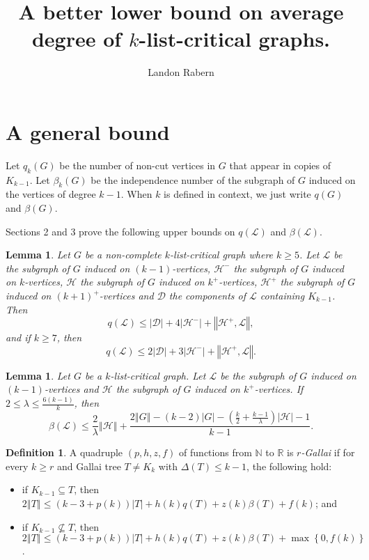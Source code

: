 \documentclass[10pt]{article}
\title{A better lower bound on average degree of $k$-list-critical graphs.}
\author{Landon Rabern}
\theoremstyle{plain}
\newtheorem{lem}[thm]{Lemma}
\theoremstyle{definition}
\newtheorem{defn}{Definition}
\theoremstyle{remark}
\newcommand{\fancy}[1]{\mathcal{#1}}
\newcommand{\IN}{\mathbb{N}}
\newcommand{\IR}{\mathbb{R}}
\newcommand{\D}{\fancy{D}}
\renewcommand{\L}{\fancy{L}}
\newcommand{\HH}{\fancy{H}}
\newcommand{\set}[1]{\left\{ #1 \right\}}
\newcommand{\card}[1]{\left|#1\right|}
\newcommand{\size}[1]{\left\Vert#1\right\Vert}
\newcommand{\parens}[1]{\left( #1 \right)}
\def\D{\fancy{D}}
\begin{document}
\maketitle

\section{A general bound}
Let $q_k(G)$ be the number of non-cut vertices in $G$ that appear in copies of $K_{k-1}$.  Let $\beta_k(G)$ be the independence number of the subgraph of $G$ induced on the vertices of degree $k-1$.  
When $k$ is defined in context, we just write $q(G)$ and $\beta(G)$.

Sections 2 and 3 prove the following upper bounds on $q(\L)$ and $\beta(\L)$.
\begin{lem}\label{qLemmaList}
	Let $G$ be a non-complete $k$-list-critical graph where $k \ge 5$.  Let $\L$ be the subgraph of $G$ induced on $(k-1)$-vertices, $\HH^-$ the subgraph of $G$ induced on $k$-vertices, 
	$\HH$ the subgraph of $G$ induced on $k^+$-vertices, $\HH^+$ the subgraph of $G$ induced on $(k+1)^+$-vertices and $\D$ the components of $\L$ containing $K_{k-1}$.  Then
	\[q(\L) \le \card{\D} + 4\card{\HH^-} + \size{\HH^+, \L},\] and if $k \ge 7$, then
	\[q(\L) \le 2\card{\D} + 3\card{\HH^-} + \size{\HH^+, \L}.\]
\end{lem}

\begin{lem}\label{betaLemmaList}
	Let $G$ be a $k$-list-critical graph.  Let $\L$ be the subgraph of $G$ induced on $(k-1)$-vertices and	$\HH$ the subgraph of $G$ induced on $k^+$-vertices.  
	If $2 \le \lambda \le \frac{6(k-1)}{k}$, then
	\[\beta(\L) \le \frac{2}{\lambda}\size{\HH} + \frac{2\size{G} - (k-2)\card{G} - \parens{\frac{k}{2} + \frac{k-1}{\lambda}}\card{\HH} - 1}{k-1}.\]
\end{lem}

\begin{defn}
A quadruple $\parens{p,h,z,f}$ of functions from $\IN$ to $\IR$ is \emph{$r$-Gallai} if for every $k \ge r$ and Gallai tree $T \ne K_k$ with $\Delta(T) \le k-1$,
the following hold:
\begin{itemize}
\item if $K_{k-1} \subseteq T$, then $2\size{T} \le \parens{k-3 + p(k)}\card{T} + h(k)q(T) + z(k)\beta(T) + f(k)$; and
\item if $K_{k-1} \not\subseteq T$, then $2\size{T} \le \parens{k-3 + p(k)}\card{T} + h(k)q(T) + z(k)\beta(T) + \max\set{0, f(k)}$.
\end{itemize}
\end{defn}
\end{document}
